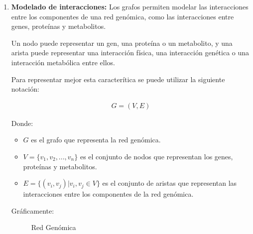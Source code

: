 \documentclass[11pt, a4paper]{article}
\begin{document}
  \begin{enumerate}
    \item \textbf{Modelado de interacciones:} Los grafos permiten modelar las interacciones entre los componentes de una red genómica, como las interacciones entre genes, proteínas y metabolitos.
    
    Un nodo puede representar un gen, una proteína o un metabolito, y una arista puede representar una interacción física, una interacción genética o una interacción metabólica entre ellos.

    Para representar mejor esta caracterítica se puede utilizar la siguiente notación:

    \begin{align*}
      G = (V, E)
    \end{align*}

    Donde: 

    \begin{itemize}
      \item $G$ es el grafo que representa la red genómica.
      \item $V = \{v_1, v_2, ..., v_n\}$ es el conjunto de nodos que representan los genes, proteínas y metabolitos.
      \item $E = \{(v_i, v_j) | v_i, v_j \in V\}$ es el conjunto de aristas que representan las interacciones entre los componentes de la red genómica.
    \end{itemize}

    Gráficamente:

    \begin{figure}[H]
      \centering
      \caption{Red Genómica}
      \label{fig:red-genomica-mejorada}
  \end{figure}


\end{enumerate}
\end{document}
